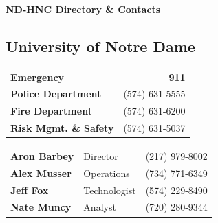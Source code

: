 \documentclass[10pt,a4paper,landscape]{article}
\begin{document}
\begin{center}
    {\Large \bfseries \color{ndblue} ND-HNC Directory \& Contacts}
\end{center}

\begin{multicols}{3}

\section*{University of Notre Dame}

\begin{tcolorbox}[title={\small\bfseries\color{ndblue} EMERGENCY}, colbacktitle=cardbg, coltitle=ndblue, detach title, before upper={\tcbtitle\vspace{4pt}\hrule\vspace{6pt}}]
\begin{tabularx}{\linewidth}{@{} X R @{}}
    \textbf{Emergency} & \textbf{911} \\
    \textbf{Police Department} & (574) 631-5555 \\
    \textbf{Fire Department} & (574) 631-6200 \\
    \textbf{Risk Mgmt. \& Safety} & (574) 631-5037 \\
\end{tabularx}
\end{tcolorbox}

\begin{tcolorbox}[title={\small\bfseries\color{ndblue} MRI PERSONNEL}, colbacktitle=cardbg, coltitle=ndblue, detach title, before upper={\tcbtitle\vspace{4pt}\hrule\vspace{6pt}}]
\begin{tabularx}{\linewidth}{@{} X X R @{}}
    \textbf{Aron Barbey} & \small{Director} & (217) 979-8002 \\
    \textbf{Alex Musser} & \small{Operations} & (734) 771-6349 \\
    \textbf{Jeff Fox} & \small{Technologist} & (574) 229-8490 \\
    \textbf{Nate Muncy} & \small{Analyst} & (720) 280-9344 \\
\end{tabularx}
\end{tcolorbox}


\end{multicols}
\end{document}
